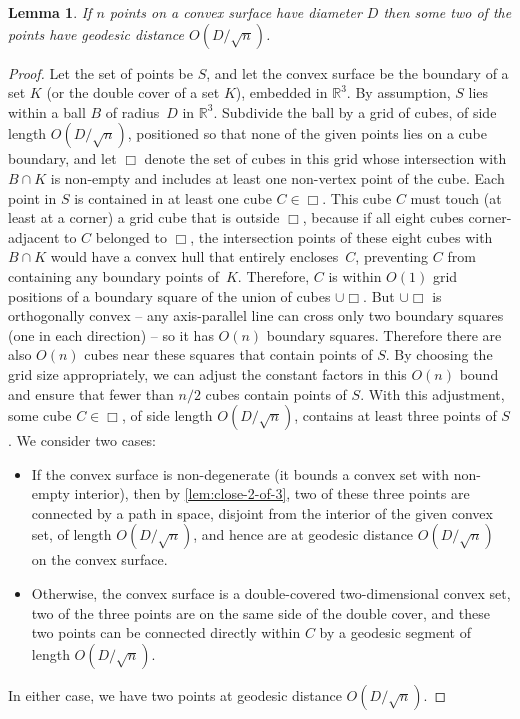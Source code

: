 \documentclass[11pt]{article}
\newtheorem{lemma}{Lemma}
\theoremstyle{definition}
\begin{document}
\begin{lemma}
\label{lem:convex-close}
If $n$ points on a convex surface have diameter $D$ then some two of the points have geodesic distance $O(D/\sqrt{n})$.
\end{lemma}

\begin{proof}
Let the set of points be $S$, and let the convex surface be the boundary of a set $K$ (or the double cover of a set $K$), embedded in $\mathbb{R}^3$. By assumption, $S$ lies within a ball $B$ of radius~$D$ in $\mathbb{R}^3$. Subdivide the ball by a grid of cubes, of side length $O(D/\sqrt{n})$, positioned so that none of the given points lies on a cube boundary, and let $\Box$ denote the set of cubes in this grid whose intersection with $B\cap K$ is non-empty and includes at least one non-vertex point of the cube. Each point in $S$ is contained in at least one cube $C\in\Box$. This cube $C$ must touch (at least at a corner) a grid cube that is outside $\Box$, because if all eight cubes corner-adjacent to $C$ belonged to $\Box$, the intersection points of these eight cubes with $B\cap K$ would have a convex hull that entirely encloses~$C$, preventing $C$ from containing any boundary points of~$K$. Therefore, $C$ is within $O(1)$ grid positions of a boundary square of the union of cubes $\cup\Box$. But $\cup\Box$ is orthogonally convex -- any axis-parallel line can cross only two boundary squares (one in each direction) -- so it has $O(n)$ boundary squares. Therefore there are also $O(n)$ cubes near these squares that contain points of $S$. By choosing the grid size appropriately, we can adjust the constant factors in this $O(n)$ bound and ensure that fewer than $n/2$ cubes contain points of $S$. With this adjustment, some cube $C\in\Box$, of side length $O(D/\sqrt{n})$, contains at least three points of $S$. We consider two cases:
\begin{itemize}
\item If the convex surface is non-degenerate (it bounds a convex set with non-empty interior),  then by \cref{lem:close-2-of-3}, two of these three points are connected by a path in space, disjoint from the interior of the given convex set, of length $O(D/\sqrt{n})$, and hence are at geodesic distance $O(D/\sqrt{n})$ on the convex surface.
\item Otherwise, the convex surface is a double-covered two-dimensional convex set, two of the three points are on the same side of the double cover, and these two points can be connected directly within $C$ by a geodesic segment of length $O(D/\sqrt{n})$.
\end{itemize}
In either case, we have two points at geodesic distance $O(D/\sqrt{n})$.
\end{proof}
\end{document}
